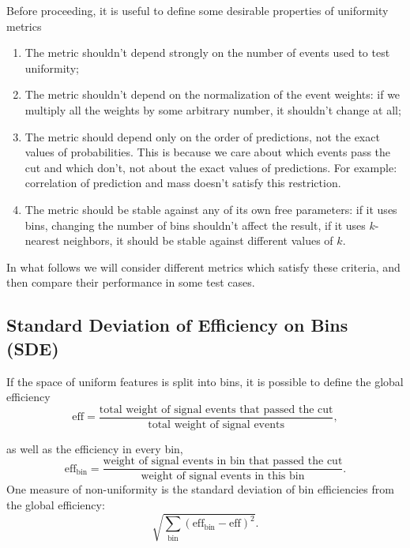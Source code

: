 Before proceeding, it is useful to define some desirable properties of uniformity metrics
\begin{enumerate}
\item
The metric shouldn't depend strongly on the number of events used to test uniformity;
\item
The metric shouldn't depend on the normalization of the event weights: if we multiply all the weights by some arbitrary number, it shouldn't change at all;
\item 
The metric should depend only on the order of predictions, not the exact values of probabilities.
This is because we care about which events pass the cut and which don't, not about the exact values of predictions.
For example: correlation of prediction and mass doesn't satisfy this restriction.
\item
The metric should be stable against any of its own free parameters: if it uses bins, changing the number of bins shouldn't affect the result,
if it uses $k$-nearest neighbors, it should be stable against different values of $k$.
\end{enumerate}
In what follows we will consider different metrics which satisfy these criteria, and then compare their performance in
some test cases.

\subsection*{Standard Deviation of Efficiency on Bins (SDE)}

\def\bineff{\text{eff}_\text{bin}}
\def\binweight{\text{weight}_\text{bin}}
\def\globaleff{\text{eff}}
\def\SDE{\text{SDE}}
\def\bin{\text{bin}}

If the space of uniform features is split into bins, it is possible to define the global efficiency
\[
	\globaleff = \dfrac{
		\text{total weight of signal events that passed the cut}}
		{\text{total weight of signal events}},
\]

as well as the efficiency in every bin, 
\[
	\bineff = \dfrac{
		\text{weight of signal events in bin that passed the cut}}
		{\text{weight of signal events in this bin}}.
\]
One measure of non-uniformity is the standard deviation of bin efficiencies from the global efficiency:
\[
	\sqrt{\sum_{\bin} \left( \bineff - \globaleff \right)^2  }.
\]


